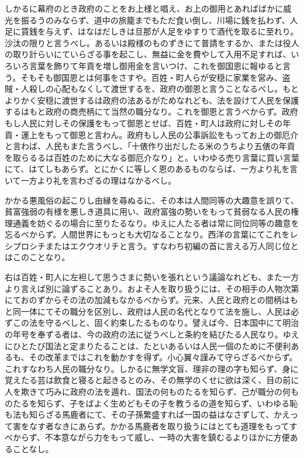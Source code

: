 \documentclass[a4paper, platex, dvipdfmx]{jsarticle}
\begin{document}
しかるに幕府のとき政府のことをお上様と唱え、お上の御用とあればばかに威光を振るうのみならず、道中の旅籠までもただ食い倒し、川場に銭を払わず、人足に賃銭を与えず、はなはだしきは旦那が人足をゆすりて酒代を取るに至れり。沙汰の限りと言うべし。あるいは殿様のものずきにて普請をするか、または役人の取り計らいにていらざる事を起こし、無益に金を費やして入用不足すれば、いろいろ言葉を飾りて年貢を増し御用金を言いつけ、これを御国恩に報ゆると言う。そもそも御国恩とは何事をさすや。百姓・町人らが安穏に家業を営み、盗賊・人殺しの心配もなくして渡世するを、政府の御恩と言うことなるべし。もとよりかく安穏に渡世するは政府の法あるがためなれども、法を設けて人民を保護するはもと政府の商売柄にて当然の職分なり。これを御恩と言うべからず。政府もし人民に対しその保護をもって御恩とせば、百姓・町人は政府に対しその年貢・運上をもって御恩と言わん。政府もし人民の公事訴訟をもってお上の御厄介と言わば、人民もまた言うべし、「十俵作り出だしたる米のうちより五俵の年貢を取らるるは百姓のために大なる御厄介なり」と。いわゆる売り言葉に買い言葉にて、はてしもあらず。とにかくに等しく恩のあるものならば、一方より礼を言いて一方より礼を言わざるの理はなかるべし。

かかる悪風俗の起こりし由縁を尋ぬるに、その本は人間同等の大趣意を誤りて、貧富強弱の有様を悪しき道具に用い、政府富強の勢いをもって貧弱なる人民の権理通義を妨ぐるの場合に至りたるなり。ゆえに人たる者は常に同位同等の趣意を忘るべからず。人間世界にもっとも大切なることなり。西洋の言葉にてこれをレシプロシチまたはエクウオリチと言う。すなわち初編の首に言える万人同じ位とはこのことなり。

右は百姓・町人に左袒して思うさまに勢いを張れという議論なれども、また一方より言えば別に論ずることあり。およそ人を取り扱うには、その相手の人物次第にておのずからその法の加減もなかるべからず。元来、人民と政府との間柄はもと同一体にてその職分を区別し、政府は人民の名代となりて法を施し、人民は必ずこの法を守るべしと、固く約束したるものなり。譬えば今、日本国中にて明治の年号を奉ずる者は、今の政府の法に従うべしと条約を結びたる人民なり。ゆえにひとたび国法と定まりたることは、たといあるいは人民一個のために不便利あるも、その改革まではこれを動かすを得ず。小心翼々謹みて守らざるべからず。これすなわち人民の職分なり。しかるに無学文盲、理非の理の字も知らず、身に覚えたる芸は飲食と寝ると起きるとのみ、その無学のくせに欲は深く、目の前に人を欺きて巧みに政府の法を遁れ、国法の何ものたるを知らず、己が職分の何ものたるを知らず、子をばよく生めどもその子を教うるの道を知らず、いわゆる恥も法も知らざる馬鹿者にて、その子孫繁盛すれば一国の益はなさずして、かえって害をなす者なきにあらず。かかる馬鹿者を取り扱うにはとても道理をもってすべからず、不本意ながら力をもって威し、一時の大害を鎮むるよりほかに方便あることなし。
\end{document}
